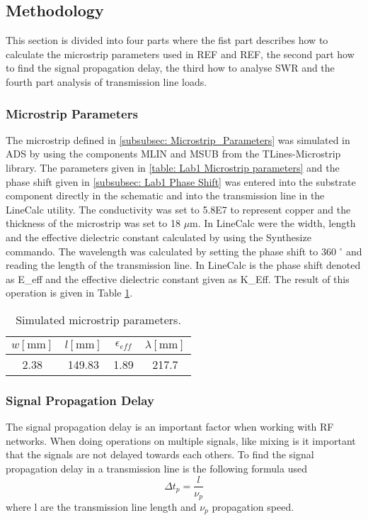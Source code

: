 \documentclass[report.tex]{subfiles}
\begin{document}
\subsection{Methodology}
This section is divided into four parts where the fist part describes how to calculate the microstrip parameters used in REF and REF, the second part how to find the signal propagation delay, the third how to analyse SWR and the fourth part analysis of transmission line loads.
\subsubsection{Microstrip Parameters}
The microstrip defined in \ref{subsubsec: Microstrip_Parameters} was simulated in ADS by using the components MLIN and MSUB from the TLines-Microstrip library. The parameters given in \ref{table: Lab1 Microstrip parameters} and the phase shift given in \ref{subsubsec: Lab1 Phase Shift} was entered into the substrate component directly in the schematic and into the transmission line in the LineCalc utility. The conductivity was set to 5.8E7 to represent copper and the thickness of the microstrip was set to 18 $\mu$m. In LineCalc were the width, length and the effective dielectric constant calculated by using the Synthesize commando. The wavelength was calculated by setting the phase shift to 360 $^\circ$ and reading the length of the transmission line. In LineCalc is the phase shift denoted as E\_eff and the effective dielectric constant given as K\_Eff. The result of this operation is given in Table \ref{table: Lab1 Simulated Microstrip parameters}.

\begin{table}[H]
    \centering
    \caption{Simulated microstrip parameters.\label{table: Lab1 Simulated Microstrip parameters}}
    \begin{tabular}{c | c | c | c}
        $w [\text{mm}]$ & $l [\text{mm}]$ & $\epsilon_{eff}$ & $\lambda [\text{mm}]$\\
        \hline
		2.38 & 149.83 & 1.89 & 217.7
    \end{tabular}
\end{table}

\subsubsection{Signal Propagation Delay}
The signal propagation delay is an important factor when working with RF networks. When doing operations on multiple signals, like mixing is it important that the signals are not delayed towards each others. To find the signal propagation delay in a transmission line is the following formula used
\begin{equation}
	\Delta t_p = \dfrac{l}{\nu_p}
\end{equation}
where l are the transmission line length and $\nu_p$ propagation speed.
\end{document}
